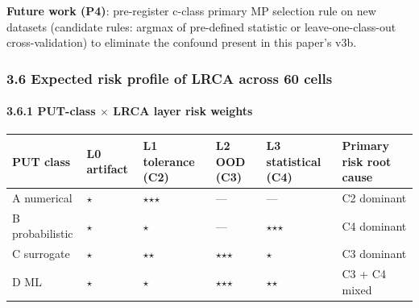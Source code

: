\documentclass[review,12pt,authoryear]{elsarticle}
\begin{document}
\textbf{Future work (P4)}: pre-register c-class primary MP selection
rule on new datasets (candidate rules: argmax of pre-defined statistic
or leave-one-class-out cross-validation) to eliminate the confound
present in this paper's v3b.

\subsubsection{3.6 Expected risk profile of LRCA across 60
cells}\label{expected-risk-profile-of-lrca-across-60-cells}

\paragraph{3.6.1 PUT-class $\times$ LRCA layer risk
weights}\label{put-class-lrca-layer-risk-weights}

{\def\LTcaptype{none} %
\begin{longtable}[]{@{}
  >{\raggedright\arraybackslash}p{}
  >{\raggedright\arraybackslash}p{}
  >{\raggedright\arraybackslash}p{}
  >{\raggedright\arraybackslash}p{}
  >{\raggedright\arraybackslash}p{}
  >{\raggedright\arraybackslash}p{}@{}}
\toprule\noalign{}
\begin{minipage}[b]{\linewidth}\raggedright
PUT class
\end{minipage} & \begin{minipage}[b]{\linewidth}\raggedright
L0 artifact
\end{minipage} & \begin{minipage}[b]{\linewidth}\raggedright
L1 tolerance (C2)
\end{minipage} & \begin{minipage}[b]{\linewidth}\raggedright
L2 OOD (C3)
\end{minipage} & \begin{minipage}[b]{\linewidth}\raggedright
L3 statistical (C4)
\end{minipage} & \begin{minipage}[b]{\linewidth}\raggedright
Primary risk root cause
\end{minipage} \\
\midrule\noalign{}
\endhead
\bottomrule\noalign{}
\endlastfoot
A numerical & $\star$ & \textbf{$\star$$\star$$\star$} & --- & --- & C2 dominant \\
B probabilistic & $\star$ & $\star$ & --- & \textbf{$\star$$\star$$\star$} & C4 dominant \\
C surrogate & $\star$ & $\star$$\star$ & \textbf{$\star$$\star$$\star$} & $\star$ & C3 dominant \\
D ML & $\star$ & $\star$ & \textbf{$\star$$\star$$\star$} & $\star$$\star$ & C3 + C4 mixed \\
\end{longtable}
}
\end{document}

